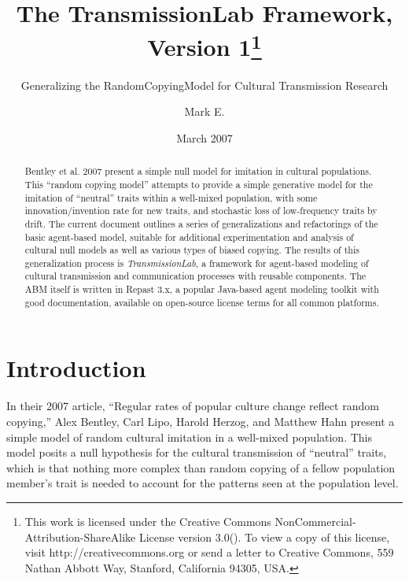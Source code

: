 \documentclass{kluwer-mem-copyright}
\begin{document}
\begin{article}
\begin{opening}
\title{The TransmissionLab Framework, Version 1\thanks{This work is licensed under the Creative Commons NonCommercial-Attribution-ShareAlike License version 3.0(\byncsa). 
To view a copy of this license, visit http://creativecommons.org or send a letter to 
Creative Commons, 559 Nathan Abbott Way, Stanford, California 94305, USA.}}
\subtitle{Generalizing the RandomCopyingModel for Cultural Transmission Research}


\author{Mark E. }  


\date{March 2007}

\begin{abstract}
Bentley et al. 2007 present a simple null model for imitation in cultural populations.  
This ``random copying model'' attempts to provide a simple generative model for the imitation of 
``neutral'' traits within a well-mixed population, with some innovation/invention rate for 
new traits, and stochastic loss of low-frequency traits by drift.  The current document 
outlines a series of generalizations and refactorings of the basic agent-based model,
suitable for additional
experimentation and analysis of cultural null models as well as various types of biased copying.   The results of this generalization process is \emph{TransmissionLab}, a framework for agent-based modeling of cultural transmission and communication processes with reusable components. 
The ABM itself is written in Repast 3.x, a popular Java-based agent modeling toolkit with good 
documentation, available on open-source license terms for all common platforms.
\end{abstract}


\end{opening}

\section{Introduction}
In their 2007 article, ``Regular rates of popular culture change reflect random copying,'' Alex Bentley, 
Carl Lipo, Harold Herzog, and Matthew Hahn present a simple model of random cultural imitation in a well-mixed
population.  This model posits a null hypothesis for the cultural transmission of ``neutral'' traits, which 
is that nothing more complex than random copying of a fellow population member's trait is needed to 
account for the patterns seen at the population level.  



\end{article}
\end{document}
